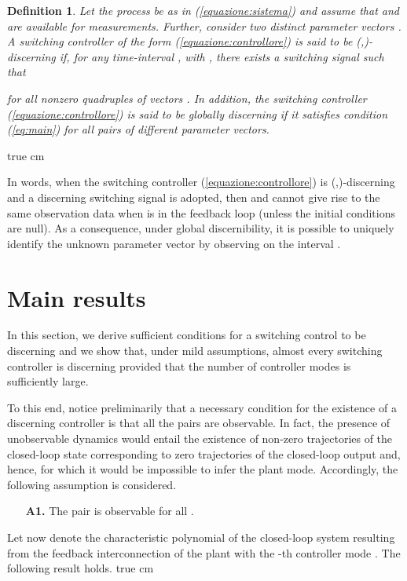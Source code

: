 \documentclass[letterpaper, 10 pt, conference]{ieeetran}
\def\qedp{\hspace*{\fill}~{\tiny }}
\def\salt{\vskip 0.2 true cm}
\newtheorem{itdefinition}{Definition}
\newenvironment{definition}{\begin{itdefinition}\rm}{\end{itdefinition}}
\begin{document}
\begin{definition} \label{def:disc:CLD} 
Let the process be as in (\ref{equazione:sistema}) and assume that  and  are available for measurements.
Further, consider two distinct parameter vectors .
A switching controller of the form (\ref{equazione:controllore}) 
is said to be (,)-\emph{discerning} if, 
for any time-interval , with , 
there exists a switching signal  such that

for all nonzero quadruples of vectors
. 
In addition, the switching controller (\ref{equazione:controllore}) is said to be 
\emph{globally discerning} if it satisfies condition (\ref{eq:main}) for all 
pairs  of different parameter vectors.
\qedp
\end{definition} 
\salt

In words, when the switching controller (\ref{equazione:controllore}) is (,)-discerning and
a discerning switching signal  is adopted, 
then   and 
cannot give rise to the same observation data 
when  is in the feedback loop (unless the initial conditions are null). As a consequence, under global discernibility, 
it is possible to uniquely identify the unknown parameter vector  by observing  on the interval .



\section{Main results}\label{main}


In this section, we derive sufficient conditions for a switching control to be discerning and we show that, under mild assumptions, almost every switching controller
is discerning provided that the number  of controller modes is sufficiently large.

To this end, notice preliminarily that a necessary condition for the existence of a discerning controller is that all the pairs 
are observable. In fact, the presence of unobservable dynamics would entail the existence
of non-zero trajectories of the closed-loop state  corresponding to zero trajectories of the closed-loop output   and, hence, for which
it would be impossible to infer the plant mode. 
Accordingly, the following assumption is considered. 

\begin{enumerate}
\item[\bf A1.] The pair  is observable for all .
\end{enumerate} 

Let now  denote the characteristic polynomial of the closed-loop system  resulting from the
feedback interconnection of the plant  with the -th controller mode . The following result holds. \salt
\end{document}
